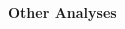 \documentclass[portrait,a0b,final,a4resizeable]{include/a0poster}
\begin{document}
\begin{poster}
\begin{multicols}{2}
%
%
%

\end{multicols}


\vspace*{3cm}

\begin{center}
\begin{pcolumn}{1.03}

{}
{
  \begin{center}
    {\sffamily \VeryHuge \textbf{Other Analyses}}
  \end{center}
}
\end{pcolumn}
\end{center}




\begin{multicols}{2}




\end{multicols}
\end{poster}
\end{document}
